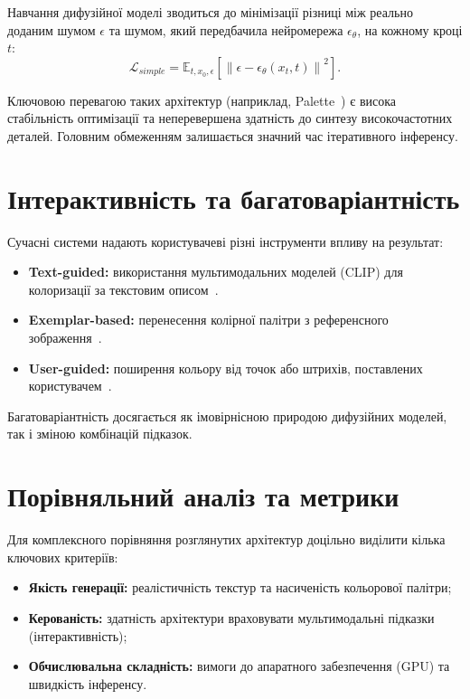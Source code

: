 \documentclass[]{iptconf}
\begin{document}
			Навчання дифузійної моделі зводиться до мінімізації різниці між реально доданим шумом $\epsilon$ та шумом, який передбачила нейромережа $\epsilon_\theta$, на кожному кроці $t$:
			\begin{equation*}
				\mathcal{L}_{simple} = \mathbb{E}_{t, x_0, \epsilon} \left[ \left\lVert \epsilon - \epsilon_\theta(x_t, t) \right\rVert^2 \right].
			\end{equation*}
			
			Ключовою перевагою таких архітектур (наприклад, Palette~\cite{2022-palette-image-to-image-diffusion-models}) є висока стабільність оптимізації та неперевершена здатність до синтезу високочастотних деталей. Головним обмеженням залишається значний час ітеративного інференсу.

	\section{Інтерактивність та багатоваріантність}

		Сучасні системи надають користувачеві різні інструменти впливу на результат:
		\begin{itemize}
			\item \textbf{Text-guided:} використання мультимодальних моделей (CLIP) для колоризації за текстовим описом~\cite{2023-l-cad, 2023-diffusing-colors}.
			\item \textbf{Exemplar-based:} перенесення колірної палітри з референсного зображення~\cite{2018-deep-exemplar-based-colorization}.
			\item \textbf{User-guided:} поширення кольору від точок або штрихів, поставлених користувачем~\cite{2017-real-time-user-guided-image-colorization, 2023-icolorit}.
		\end{itemize}
		Багатоваріантність досягається як імовірнісною природою дифузійних моделей, так і зміною комбінацій підказок.
	\section{Порівняльний аналіз та метрики}

		Для комплексного порівняння розглянутих архітектур доцільно виділити кілька ключових критеріїв:
        \begin{itemize}
            \item \textbf{Якість генерації:} реалістичність текстур та насиченість кольорової палітри;
            \item \textbf{Керованість:} здатність архітектури враховувати мультимодальні підказки (інтерактивність);
            \item \textbf{Обчислювальна складність:} вимоги до апаратного забезпечення (GPU) та швидкість інференсу.
        \end{itemize}
\end{document}
